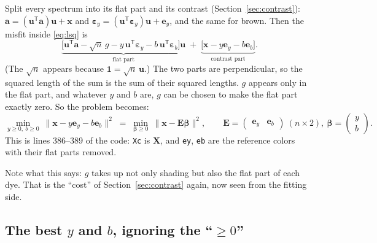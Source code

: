 \documentclass[11pt,letterpaper]{article}
\newcommand{\code}[1]{\texttt{#1}}
\newcommand{\va}{\mathbf{a}}
\newcommand{\vx}{\mathbf{x}}
\newcommand{\vone}{\mathbf{1}}
\newcommand{\vu}{\mathbf{u}}
\newcommand{\epsy}{\bm{\varepsilon}_y}
\newcommand{\epsb}{\bm{\varepsilon}_b}
\newcommand{\ey}{\mathbf{e}_y}
\newcommand{\eb}{\mathbf{e}_b}
\newcommand{\mX}{\mathbf{X}}
\newcommand{\mE}{\mathbf{E}}
\newcommand{\T}{^{\mathsf{T}}}
\begin{document}
Split every spectrum into its flat part and its contrast
(Section~\ref{sec:contrast}): $\va = (\vu\T\va)\vu + \vx$ and $\epsy =
(\vu\T\epsy)\vu + \ey$, and the same for brown.  Then the misfit inside
\eqref{eq:lsq} is
\[
\underbrace{\bigl[\vu\T\va - \sqrt n\,g - y\,\vu\T\epsy -
b\,\vu\T\epsb\bigr]\vu}_{\text{flat part}}
\;+\;
\underbrace{\bigl[\vx - y\ey - b\eb\bigr]}_{\text{contrast part}} .
\]
(The $\sqrt n$ appears because $\vone = \sqrt n\,\vu$.)  The two parts are
perpendicular, so the squared length of the sum is the sum of their squared
lengths.  $g$ appears only in the flat part, and whatever $y$ and $b$ are,
$g$ can be chosen to make the flat part exactly zero.  So the problem
becomes:
\begin{equation}
\min_{y\ge0,\ b\ge0}\ \bigl\|\vx - y\ey - b\eb\bigr\|^2
\;=\; \min_{\bm\beta\ge0}\ \|\vx - \mE\bm\beta\|^2,
\qquad
\mE = \begin{pmatrix}\ey & \eb\end{pmatrix}\ (n\times 2),\
\bm\beta = \begin{pmatrix} y\\ b\end{pmatrix}.
\label{eq:lsq2}
\end{equation}
This is lines 386--389 of the code: \code{Xc} is $\mX$, and \code{ey},
\code{eb} are the reference colors with their flat parts removed.

Note what this says: $g$ takes up not only shading but also the flat part of
each dye.  That is the ``cost'' of Section~\ref{sec:contrast} again, now seen
from the fitting side.

\subsection{The best $y$ and $b$, ignoring the ``$\ge 0$''}
\end{document}
